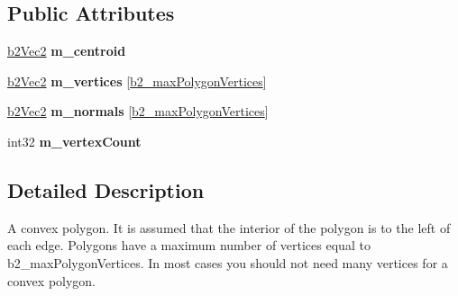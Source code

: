 \subsection*{Public Attributes}
\begin{DoxyCompactItemize}
\item 
\hypertarget{classb2_polygon_shape_ae8f5bd2f13f1e9b741c33350ba19cd9f}{\hyperlink{structb2_vec2}{b2\-Vec2} {\bfseries m\-\_\-centroid}}\label{classb2_polygon_shape_ae8f5bd2f13f1e9b741c33350ba19cd9f}

\item 
\hypertarget{classb2_polygon_shape_a11ee5c107660be5da25f0e164aaccd53}{\hyperlink{structb2_vec2}{b2\-Vec2} {\bfseries m\-\_\-vertices} \mbox{[}\hyperlink{b2_settings_8h_a09d71ee1993bee28b5b2e6d893b41884}{b2\-\_\-max\-Polygon\-Vertices}\mbox{]}}\label{classb2_polygon_shape_a11ee5c107660be5da25f0e164aaccd53}

\item 
\hypertarget{classb2_polygon_shape_a97cdcec277321c62ecdf93cb649958ce}{\hyperlink{structb2_vec2}{b2\-Vec2} {\bfseries m\-\_\-normals} \mbox{[}\hyperlink{b2_settings_8h_a09d71ee1993bee28b5b2e6d893b41884}{b2\-\_\-max\-Polygon\-Vertices}\mbox{]}}\label{classb2_polygon_shape_a97cdcec277321c62ecdf93cb649958ce}

\item 
\hypertarget{classb2_polygon_shape_a45902db31f1a135b259f7967fd05f2f0}{int32 {\bfseries m\-\_\-vertex\-Count}}\label{classb2_polygon_shape_a45902db31f1a135b259f7967fd05f2f0}

\end{DoxyCompactItemize}


\subsection{Detailed Description}
A convex polygon. It is assumed that the interior of the polygon is to the left of each edge. Polygons have a maximum number of vertices equal to b2\-\_\-max\-Polygon\-Vertices. In most cases you should not need many vertices for a convex polygon. 

